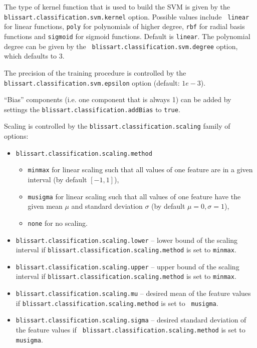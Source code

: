 The type of kernel function that is used to build the SVM is given by the {\tt
  blissart.classification.svm.kernel} option. Possible values include {\tt
  linear} for linear functions, {\tt poly} for polynomials of higher degree,
{\tt rbf} for radial basis functions and {\tt sigmoid} for sigmoid functions.
Default is {\tt linear}. The polynomial degree can be given by the {\tt
  blissart.classification.svm.degree} option, which defaults to 3.
       
The precision of the training procedure is controlled by the {\tt
  blissart.classification.svm.epsilon} option (default: $1e-3$).
   
``Bias'' components (i.e. one component that is always 1) can be added by
settings the {\tt blissart.classification.addBias} to {\tt true}.

Scaling is controlled by the {\tt blissart.classification.scaling} family of
options:

\begin{itemize}
  \item {\tt blissart.classification.scaling.method}
    \begin{itemize}
      \item {\tt minmax} for linear scaling such that all values of one feature
        are in a given interval (by default $[-1,1]$),
      \item {\tt musigma} for linear scaling such that all values of one feature
        have the given mean $\mu$ and standard deviation $\sigma$ (by default
        $\mu = 0, \sigma = 1$),
      \item {\tt none} for no scaling.
    \end{itemize}
  \item {\tt blissart.classification.scaling.lower} -- lower bound of the
    scaling interval if {\tt blissart.classification.scaling.method} is set to
    {\tt minmax}.
  \item {\tt blissart.classification.scaling.upper} -- upper bound of the
    scaling interval if {\tt blissart.classification.scaling.method} is set to
    {\tt minmax}.
  \item {\tt blissart.classification.scaling.mu} -- desired mean of the feature
    values if {\tt blissart.classification.scaling.method} is set to {\tt
      musigma}.
  \item {\tt blissart.classification.scaling.sigma} -- desired standard
    deviation of the feature values if {\tt
      blissart.classification.scaling.method} is set to {\tt musigma}.
\end{itemize}
